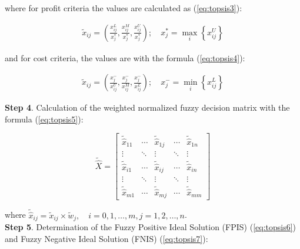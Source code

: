 \noindent where for profit criteria the values are calculated as (\ref{eq:topsis3}):

\begin{equation}
\begin{array}{l}
\tilde{x}_{i j}=\left(\frac{x_{i j}^L}{x_{j}^{*}}, \frac{x_{i j}^M}{x_{j}^{*}}, \frac{x_{i j}^U}{x_{j}^{*}}\right); \quad x_{j}^{*}=\max _{i}\left\{x_{i j}^U\right\}
\end{array}
\label{eq:topsis3}
\end{equation}

\noindent and for cost criteria, the values are with the formula (\ref{eq:topsis4}):

\begin{equation}
\begin{array}{l}
\tilde{x}_{i j}=\left(\frac{x_{j}^{-}}{x_{i j}^U}, \frac{x_{j}^{-}}{x_{i j}^M}, \frac{x_{j}^{-}}{x_{i j}^L}\right); \quad x_{j}^{-}=\min _{i}\left\{x_{i j}^L\right\}
\end{array}
\label{eq:topsis4}
\end{equation}

\noindent \textbf{Step 4}. Calculation of the weighted normalized fuzzy decision matrix with the formula (\ref{eq:topsis5}):

\begin{equation}
\widetilde{\widehat{X}}=\left[\begin{array}{ccccc}
\widetilde{\widehat{x}}_{11} & \cdots & \widetilde{\widehat{x}}_{1 j} & \cdots & \widetilde{\widehat{x}}_{1 n} \\
\vdots & \ddots & \vdots & \ddots & \vdots \\
\widetilde{\widehat{x}}_{i 1} & \cdots & \widetilde{\widehat{x}}_{i j} & \cdots & \widetilde{\widehat{x}}_{i n} \\
\vdots & \ddots & \vdots & \ddots & \vdots \\
\widetilde{\widehat{x}}_{m 1} & \cdots & \widetilde{\widehat{x}}_{m j} & \cdots & \widetilde{\widehat{x}}_{m m}
\end{array}\right]
\label{eq:topsis5}
\end{equation}

\noindent where $\widetilde{\widehat{x}}_{i j}=\tilde{x}_{i j} \times \widetilde{w}_j, \quad i=0,1, \ldots, m, j=1,2, \ldots, n$. \\

\noindent \textbf{Step 5}. Determination of the Fuzzy Positive Ideal Solution (FPIS) (\ref{eq:topsis6}) and Fuzzy Negative Ideal Solution (FNIS) (\ref{eq:topsis7}):

